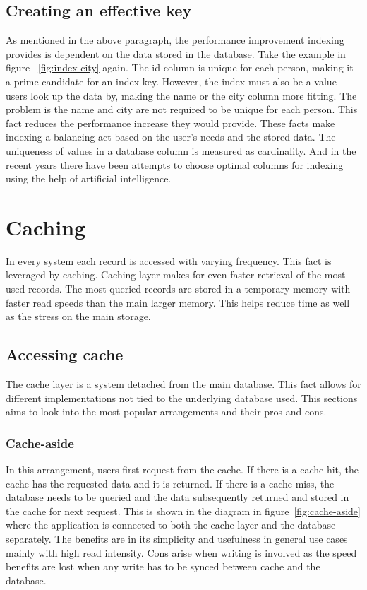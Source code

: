 \documentclass[10pt,twoside,a4paper]{article}
\begin{document}
\subsection{Creating an effective key}
As mentioned in the above paragraph, the performance improvement indexing provides is dependent on the data stored in the database.
Take the example in figure ~\ref{fig:index-city} again. The id column is unique for each person, making it a prime candidate for an index key. However, the index must also be a value users look up the data by, making the name or the city column more fitting. The problem is the name and city are not required to be unique for each person. This fact reduces the performance increase they would provide. These facts make indexing a balancing act based on the user's needs and the stored data. The uniqueness of values in a database column is measured as cardinality. And in the recent years there have been attempts to choose optimal columns for indexing using the help of artificial intelligence\cite{li2023stone}.

\section{Caching}
In every system each record is accessed with varying frequency. This fact is leveraged by caching\cite{10.1145/3009837.3009891}. Caching layer makes for even faster retrieval of the most used records. The most queried records are stored in a temporary memory with faster read speeds than the main larger memory. This helps reduce time as well as the stress on the main storage.

\subsection{Accessing cache}
The cache layer\cite{AWS}\cite{Prisma} is a system detached from the main database. This fact allows for different implementations not tied to the underlying database used. This sections aims to look into the most popular arrangements and their pros and cons.

\subsubsection{Cache-aside}
\label{sec:cache-aside}
In this arrangement, users first request from the cache. If there is a cache hit, the cache has the requested data and it is returned. If there is a cache miss, the database needs to be queried and the data subsequently returned and stored in the cache for next request. This is shown in the diagram in figure~\ref{fig:cache-aside} where the application is connected to both the cache layer and the database separately. The benefits are in its simplicity and usefulness in general use cases mainly with high read intensity. 
Cons arise when writing is involved as the speed benefits are lost when any write has to be synced between cache and the database.
\end{document}
